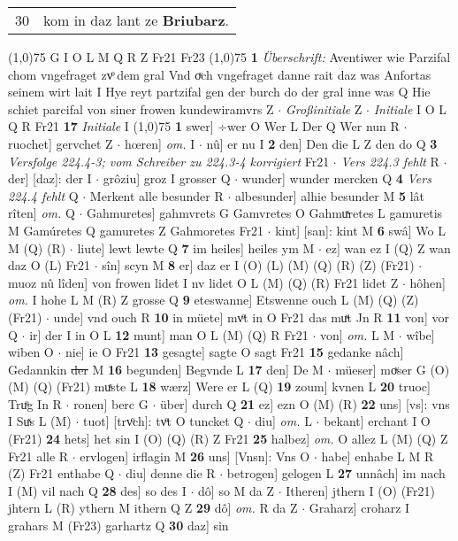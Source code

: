 \documentclass[8pt,a4paper,notitlepage]{article}
\begin{document}
\begin{table}[ht]
\begin{minipage}[t]{0.5\linewidth}
\begin{tabular}{rl}
30 & kom in daz lant ze \textbf{Briubarz}.\\ 
\end{tabular}
\scriptsize
\line(1,0){75} \newline
G I O L M Q R Z Fr21 Fr23 \newline
\line(1,0){75} \newline
\textbf{1} \textit{Überschrift:} Aventiwer wie Parzifal chom vngefraget zvͦ dem gral Vnd oͮch vngefraget danne rait daz was Anfortas seinem wirt lait I  Hye reyt partzifal gen der burch do der gral inne was Q  Hie schiet parcifal von siner frowen kundewiramvrs Z   $\cdot$ \textit{Großinitiale} Z   $\cdot$ \textit{Initiale} I O L Q R Fr21  \textbf{17} \textit{Initiale} I  \newline
\line(1,0){75} \newline
\textbf{1} swer] ÷wer O Wer L Der Q Wer nun R  $\cdot$ ruochet] gervchet Z  $\cdot$ hœren] \textit{om.} I  $\cdot$ nû] er nu I \textbf{2} den] Den die L Z den do Q \textbf{3} \textit{Versfolge 224.4-3; vom Schreiber zu 224.3-4 korrigiert} Fr21   $\cdot$ \textit{Vers 224.3 fehlt} R   $\cdot$ der] [daz]: der I  $\cdot$ grôziu] groz I grosser Q  $\cdot$ wunder] wunder mercken Q \textbf{4} \textit{Vers 224.4 fehlt} Q   $\cdot$ Merkent alle besunder R  $\cdot$ albesunder] alhie besunder M \textbf{5} lât rîten] \textit{om.} Q  $\cdot$ Gahmuretes] gahmvrets G Gamvretes O Gahmuͯretes L gamuretis M Gamúretes Q gamuretes Z Gahmoretes Fr21  $\cdot$ kint] [san]: kint M \textbf{6} swâ] Wo L M (Q) (R)  $\cdot$ liute] lewt lewte Q \textbf{7} im heiles] heiles ym M  $\cdot$ ez] wan ez I (Q) Z wan daz O (L) Fr21  $\cdot$ sîn] scyn M \textbf{8} er] daz er I (O) (L) (M) (Q) (R) (Z) (Fr21)  $\cdot$ muoz nû lîden] von frowen lidet I nv lidet O L (M) (Q) (R) Fr21 lidet Z  $\cdot$ hôhen] \textit{om.} I hohe L M (R) Z grosse Q \textbf{9} eteswanne] Etswenne ouch L (M) (Q) (Z) (Fr21)  $\cdot$ unde] vnd ouch R \textbf{10} in müete] mvͦt in O Fr21 das muͯt Jn R \textbf{11} von] vor Q  $\cdot$ ir] der I in O L \textbf{12} munt] man O L (M) (Q) R Fr21  $\cdot$ von] \textit{om.} L M  $\cdot$ wîbe] wiben O  $\cdot$ nie] ie O Fr21 \textbf{13} gesagte] sagte O sagt Fr21 \textbf{15} gedanke nâch] Gedannkin \sout{der} M \textbf{16} begunden] Begvnde L \textbf{17} den] De M  $\cdot$ müeser] moͮser G (O) (M) (Q) (Fr21) muͯste L \textbf{18} wærz] Were er L (Q) \textbf{19} zoum] kvnen L \textbf{20} truoc] Truͦg In R  $\cdot$ ronen] berc G  $\cdot$ über] durch Q \textbf{21} ez] ezn O (M) (R) \textbf{22} uns] [vs]: vns I Suͯs L (M)  $\cdot$ tuot] [trvͦch]: tvͦt O tuncket Q  $\cdot$ diu] \textit{om.} L  $\cdot$ bekant] erchant I O (Fr21) \textbf{24} hets] het sin I (O) (Q) (R) Z Fr21 \textbf{25} halbez] \textit{om.} O allez L (M) (Q) Z Fr21 alle R  $\cdot$ ervlogen] irflagin M \textbf{26} uns] [Vnsn]: Vns O  $\cdot$ habe] enhabe L M R (Z) Fr21 enthabe Q  $\cdot$ diu] denne die R  $\cdot$ betrogen] gelogen L \textbf{27} unnâch] im nach I (M) vil nach Q \textbf{28} des] so des I  $\cdot$ dô] so M da Z  $\cdot$ Itheren] jthern I (O) (Fr21) jhtern L (R) ythern M ithern Q Z \textbf{29} dô] \textit{om.} R da Z  $\cdot$ Graharz] croharz I grahars M (Fr23) garhartz Q \textbf{30} daz] sin 
\end{minipage}
\end{table}
\end{document}
